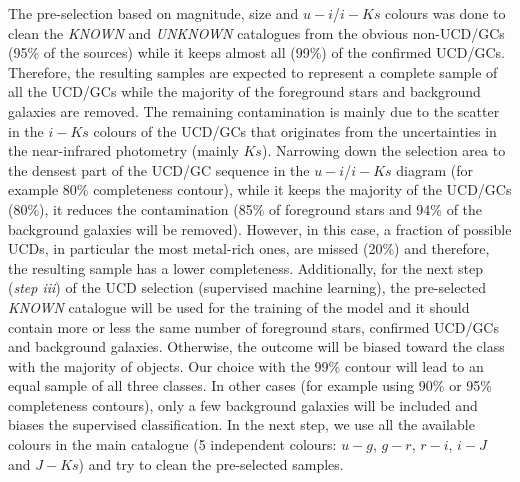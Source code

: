 \documentclass[fleqn,usenatbib]{mnras}
\begin{document}
The pre-selection based on magnitude, size and $u-i$/$i-Ks$ colours was done to clean the \textit{KNOWN} and \textit{UNKNOWN} catalogues from the obvious non-UCD/GCs (95\% of the sources) while it keeps almost all (99\%) of the confirmed UCD/GCs. Therefore, the resulting samples are expected to represent a complete sample of all the UCD/GCs while the majority of the foreground stars and background galaxies are removed. The remaining contamination is mainly due to the scatter in the $i-Ks$ colours of the UCD/GCs that originates from the uncertainties in the near-infrared photometry (mainly $Ks$). Narrowing down the selection area to the densest part of the UCD/GC sequence in the $u-i$/$i-Ks$ diagram (for example 80\% completeness contour), while it keeps the majority of the UCD/GCs (80\%), it reduces the contamination (85\% of foreground stars and 94\% of the background galaxies will be removed). However, in this case, a fraction of possible UCDs, in particular the most metal-rich ones, are missed (20\%) and therefore, the resulting sample has a lower completeness. Additionally, for the next step (\textit{step iii}) of the UCD selection (supervised machine learning), the pre-selected \textit{KNOWN} catalogue will be used for the training of the model and it should contain more or less the same number of foreground stars, confirmed UCD/GCs and background galaxies. Otherwise, the outcome will be biased toward the class with the majority of objects. Our choice with the 99\% contour will lead to an equal sample of all three classes. In other cases (for example using 90\% or 95\% completeness contours), only a few background galaxies will be included and biases the supervised classification. In the next step, we use all the available colours in the main catalogue (5 independent colours: $u-g$, $g-r$, $r-i$, $i-J$ and $J-Ks$) and try to clean the pre-selected samples.
\end{document}
